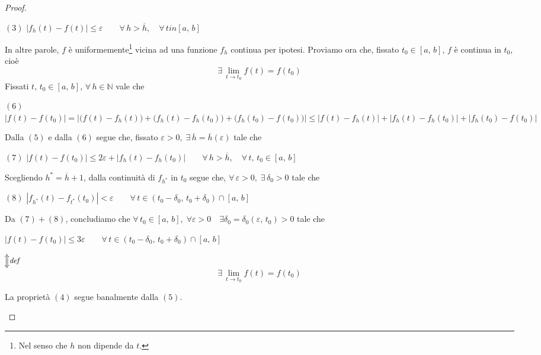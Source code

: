 \begin{proof}
\begin{enumerate}[labelindent=\parindent,leftmargin=*,label=\textnormal{(\roman*)},start=1]
\begin{center}
$\mathrm{(3)}$
\hfill
$\displaystyle
\left| f_h(t)-f(t) \right| \leq \varepsilon \qquad \forall \, h > \overline{h}, \quad \forall \, t in [a,\,b]
$
\hfill \null \\
\end{center}
In altre parole, $f$ è uniformemente\footnote{Nel senso che $h$ non dipende da $t$.} vicina ad una funzione $f_h$ continua per ipotesi. Proviamo ora che, fissato $t_0 \in [a,\,b]$, $f$ è continua in $t_0$, cioè
$$
\exists \, \lim_{t \rightarrow t_0} f(t) = f(t_0)
$$
Fissati $t,\,t_0 \in [a,\,b]$, $\forall \, h \in \mathbb{N}$ vale che
\begin{center}
$\mathrm{(6)}$
\hfill
$\displaystyle
|f(t)-f(t_0)| = 
\left| \big(f(t)-f_h(t)\big)+\big(f_h(t)-f_h(t_0)\big)+\big(f_h(t_0)-f(t_0)\big) \right| \leq
|f(t)-f_h(t)| + |f_h(t)-f_h(t_0)| + |f_h(t_0)-f(t_0)|
$
\hfill \null \\
\end{center}
Dalla $\mathrm{(5)}$ e dalla $\mathrm{(6)}$ segue che, fissato $\varepsilon > 0, \; \exists \, \overline{h} = \overline{h}(\varepsilon)$ tale che
\begin{center}
$\mathrm{(7)}$
\hfill
$\displaystyle
|f(t)-f(t_0)| \leq 2\varepsilon + |f_h(t)-f_h(t_0)| \qquad \forall \, h > \overline{h}, \quad \forall \, t,\,t_0 \in [a,\,b]
$
\hfill \null \\
\end{center}
Scegliendo $h^* = \overline{h}+1$, dalla continuità di $f_{h^*}$ in $t_0$ segue che, $\forall \, \varepsilon > 0, \; \exists \, \delta_0 > 0$ tale che
\begin{center}
$\mathrm{(8)}$
\hfill
$\displaystyle
|f_{h^*}(t)-f_{t^*}(t_0)| < \varepsilon \qquad \forall \, t \in (t_0-\delta_0,\,t_0+\delta_0) \cap [a,\,b]
$
\hfill \null \\
\end{center}
Da $\mathrm{(7)}+\mathrm{(8)}$, concludiamo che $\forall \, t_0 \in [a,\,b], \; \forall \varepsilon > 0 \quad \exists \delta_0 = \delta_0(\varepsilon,\,t_0) > 0$ tale che
\begin{center}
$ \displaystyle
|f(t) - f(t_0)| \leq 3\varepsilon \qquad \forall \, t \in (t_0-\delta_0,\,t_0+\delta_0) \cap [a,\,b]
$\\
$ \displaystyle
\rotatebox{270}{$\overset{\rotatebox{90}{\footnotesize \textit{def}}}{\Longleftrightarrow}$}
$\\
$$
\exists \, \lim_{t \rightarrow t_0} f(t) = f(t_0)
$$
\end{center}
La proprietà $\mathrm{(4)}$ segue banalmente dalla $\mathrm{(5)}$.
\end{enumerate}
\end{proof}

